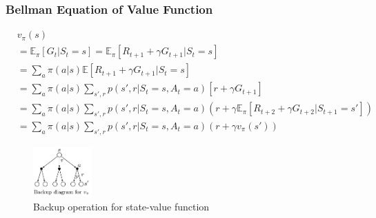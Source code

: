 \documentclass[10pt]{beamer}
\theoremstyle{remark}
\begin{document}
\begin{frame}
    \frametitle{Bellman Equation of Value Function}
    \begin{align*}
         &v_\pi(s)  \\
         &= \mathbb{E}_{\pi}[G_t | S_t =s] = \mathbb{E}_{\pi} \left[ R_{t+1} + \gamma G_{t+1} | S_t =s \right] \\
         &= \sum_{a} \pi(a|s) \mathbb{E} \left[ R_{t+1} + \gamma G_{t+1} | S_t =s \right] \\
         &= \sum_{a} \pi(a|s) \sum_{s', r} p(s', r| S_t = s, A_t = a) \left[ r + \gamma G_{t+1} \right] \\
         &= \sum_{a} \pi(a|s) \sum_{s', r} p(s', r| S_t = s, A_t = a) \left( r + \gamma \mathbb{E}_\pi \left[ R_{t+2} + \gamma G_{t+2} | S_{t+1} = s' \right] \right) \\
        &= \sum_{a} \pi(a|s) \sum_{s', r} p(s', r| S_t = s, A_t = a) \left( r + \gamma v_\pi(s') \right)
    \end{align*}
    \begin{figure}
        \includegraphics[width=0.2\textwidth]{figures/bellman_visual.png}
        \caption{Backup operation for state-value function}
    \end{figure}
\end{frame}

%
\end{document}
